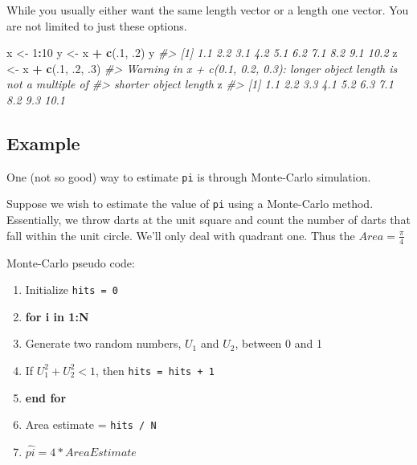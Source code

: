 \documentclass[]{book}
\newenvironment{Shaded}{\begin{snugshade}}{\end{snugshade}}
\newcommand{\CommentTok}[1]{\textcolor[rgb]{0.56,0.35,0.01}{\textit{#1}}}
\newcommand{\DecValTok}[1]{\textcolor[rgb]{0.00,0.00,0.81}{#1}}
\newcommand{\FloatTok}[1]{\textcolor[rgb]{0.00,0.00,0.81}{#1}}
\newcommand{\KeywordTok}[1]{\textcolor[rgb]{0.13,0.29,0.53}{\textbf{#1}}}
\newcommand{\NormalTok}[1]{#1}
\newcommand{\OperatorTok}[1]{\textcolor[rgb]{0.81,0.36,0.00}{\textbf{#1}}}
\newcommand{\StringTok}[1]{\textcolor[rgb]{0.31,0.60,0.02}{#1}}
\providecommand{\tightlist}{%
  \setlength{\itemsep}{0pt}\setlength{\parskip}{0pt}}
\theoremstyle{definition}
\theoremstyle{definition}
\theoremstyle{definition}
\theoremstyle{remark}
\begin{document}
While you usually either want the same length vector or a length one
vector. You are not limited to just these options.

\begin{Shaded}
\begin{Highlighting}[]
\NormalTok{x <-}\StringTok{ }\DecValTok{1}\OperatorTok{:}\DecValTok{10}
\NormalTok{y <-}\StringTok{ }\NormalTok{x }\OperatorTok{+}\StringTok{ }\KeywordTok{c}\NormalTok{(.}\DecValTok{1}\NormalTok{, }\FloatTok{.2}\NormalTok{) }
\NormalTok{y}
\CommentTok{#>  [1]  1.1  2.2  3.1  4.2  5.1  6.2  7.1  8.2  9.1 10.2}
\NormalTok{z <-}\StringTok{ }\NormalTok{x }\OperatorTok{+}\StringTok{ }\KeywordTok{c}\NormalTok{(.}\DecValTok{1}\NormalTok{, }\FloatTok{.2}\NormalTok{, }\FloatTok{.3}\NormalTok{)}
\CommentTok{#> Warning in x + c(0.1, 0.2, 0.3): longer object length is not a multiple of}
\CommentTok{#> shorter object length}
\NormalTok{z}
\CommentTok{#>  [1]  1.1  2.2  3.3  4.1  5.2  6.3  7.1  8.2  9.3 10.1}
\end{Highlighting}
\end{Shaded}

\hypertarget{example}{%
\subsection{Example}\label{example}}

One (not so good) way to estimate \texttt{pi} is through Monte-Carlo
simulation.

Suppose we wish to estimate the value of \texttt{pi} using a Monte-Carlo
method. Essentially, we throw darts at the unit square and count the
number of darts that fall within the unit circle. We'll only deal with
quadrant one. Thus the \(Area = \frac{\pi}{4}\)

Monte-Carlo pseudo code:

\begin{enumerate}
\def\labelenumi{\arabic{enumi}.}
\tightlist
\item
  Initialize \texttt{hits\ =\ 0}
\item
  \textbf{for i in 1:N}
\item
  Generate two random numbers, \(U_1\) and \(U_2\), between 0 and 1
\item
  If \(U_1^2 + U_2^2 < 1\), then \texttt{hits\ =\ hits\ +\ 1}
\item
  \textbf{end for}
\item
  Area estimate = \texttt{hits\ /\ N}
\item
  \(\hat{pi} = 4 * Area Estimate\)
\end{enumerate}
\end{document}
